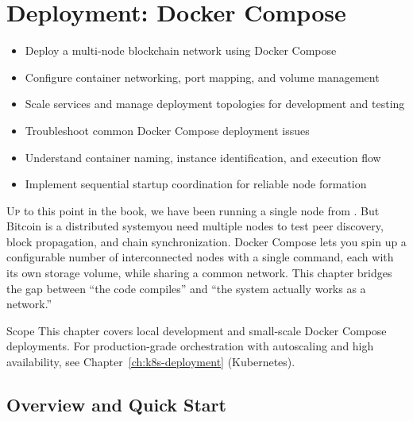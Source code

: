 \chapter{Deployment: Docker Compose}
\label{ch:docker-deployment}

\begin{learnbox}
\begin{itemize}
  \item Deploy a multi-node blockchain network using Docker Compose
  \item Configure container networking, port mapping, and volume management
  \item Scale services and manage deployment topologies for development and testing
  \item Troubleshoot common Docker Compose deployment issues
  \item Understand container naming, instance identification, and execution flow
  \item Implement sequential startup coordination for reliable node formation
\end{itemize}
\end{learnbox}

\lettrine{U}{p} to this point in the book, we have been running a single node from . But Bitcoin is a distributed system\textemdash you need multiple nodes to test peer discovery, block propagation, and chain synchronization. Docker Compose lets you spin up a configurable number of interconnected nodes with a single command, each with its own storage volume, while sharing a common network. This chapter bridges the gap between ``the code compiles'' and ``the system actually works as a network.''

\begin{infobox}{Scope}
This chapter covers local development and small-scale Docker Compose deployments. For production-grade orchestration with autoscaling and high availability, see Chapter~\ref{ch:k8s-deployment} (Kubernetes).
\end{infobox}

\section{Overview and Quick Start}
\label{sec:docker-overview}

